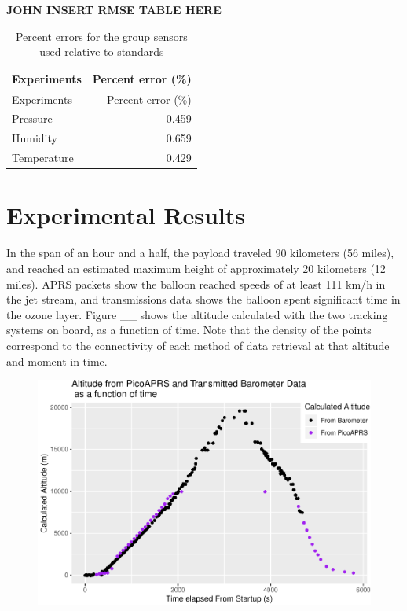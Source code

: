 \documentclass[12pt,]{article}
\begin{document}
\textbf{JOHN INSERT RMSE TABLE HERE}

\begin{longtable}[]{@{}lr@{}}
\caption{Percent errors for the group sensors used relative to
standards}\tabularnewline
\toprule
Experiments & Percent error (\%)\tabularnewline
\midrule
\endfirsthead
\toprule
Experiments & Percent error (\%)\tabularnewline
\midrule
\endhead
Pressure & 0.459\tabularnewline
Humidity & 0.659\tabularnewline
Temperature & 0.429\tabularnewline
\bottomrule
\end{longtable}

\section{Experimental Results}\label{experimental-results}

In the span of an hour and a half, the payload traveled 90 kilometers
(56 miles), and reached an estimated maximum height of approximately 20
kilometers (12 miles). APRS packets show the balloon reached speeds of
at least 111 km/h in the jet stream, and transmissions data shows the
balloon spent significant time in the ozone layer. Figure \_\_ shows the
altitude calculated with the two tracking systems on board, as a
function of time. Note that the density of the points correspond to the
connectivity of each method of data retrieval at that altitude and
moment in time.

\begin{figure}[h]

{\centering \includegraphics{paper_files/figure-latex/altitude-1} 

}

\caption{\label{fig:figs}}\label{fig:altitude}
\end{figure}
\end{document}
